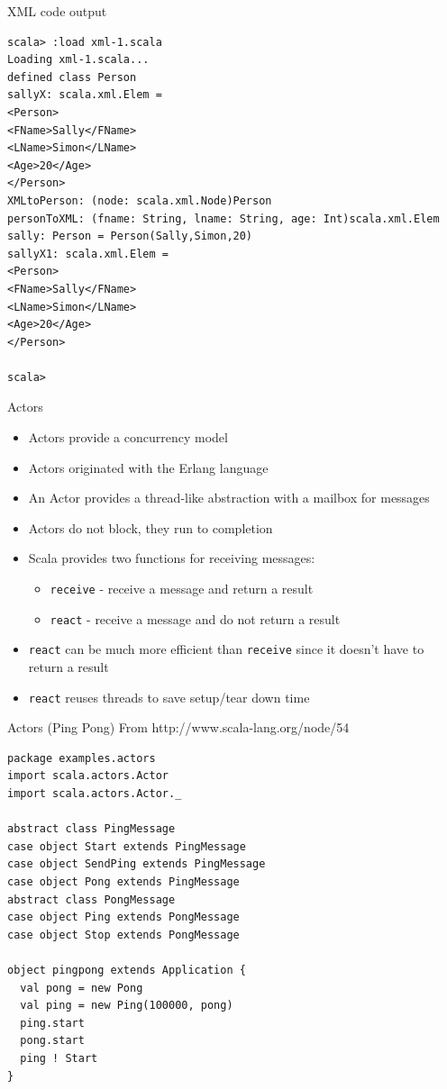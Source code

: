 \documentclass[t]{beamer}
\begin{document}
\begin{frame}[fragile]{XML code output}
  \begin{tiny}
  \begin{verbatim}
scala> :load xml-1.scala
Loading xml-1.scala...
defined class Person
sallyX: scala.xml.Elem = 
<Person>
<FName>Sally</FName>
<LName>Simon</LName>
<Age>20</Age>
</Person>
XMLtoPerson: (node: scala.xml.Node)Person
personToXML: (fname: String, lname: String, age: Int)scala.xml.Elem
sally: Person = Person(Sally,Simon,20)
sallyX1: scala.xml.Elem = 
<Person>
<FName>Sally</FName>
<LName>Simon</LName>
<Age>20</Age>
</Person>

scala> 
  \end{verbatim}
  \end{tiny}
  \note{}
\end{frame}

\begin{frame}{Actors}
  \begin{itemize}
  \item Actors provide a concurrency model
  \item Actors originated with the Erlang language
  \item An Actor provides a thread-like abstraction with a mailbox for messages
  \item Actors do not block, they run to completion
  \item Scala provides two functions for receiving messages:
    \begin{itemize}
    \item {\tt receive} - receive a message and return a result
    \item {\tt react} - receive a message and do not return a result
    \end{itemize}
  \item {\tt react} can be much more efficient than {\tt receive}
    since it doesn't have to return a result
  \item {\tt react} reuses threads to save setup/tear down time
  \end{itemize}
  \note{}
\end{frame}

\begin{frame}[fragile]{Actors (Ping Pong)}
    From http://www.scala-lang.org/node/54
  \begin{tiny}
  \begin{verbatim}
package examples.actors
import scala.actors.Actor
import scala.actors.Actor._

abstract class PingMessage
case object Start extends PingMessage
case object SendPing extends PingMessage
case object Pong extends PingMessage
abstract class PongMessage
case object Ping extends PongMessage
case object Stop extends PongMessage

object pingpong extends Application {
  val pong = new Pong
  val ping = new Ping(100000, pong)
  ping.start
  pong.start
  ping ! Start
}
  \end{verbatim}
  \end{tiny}
  \note{}
\end{frame}
\end{document}

